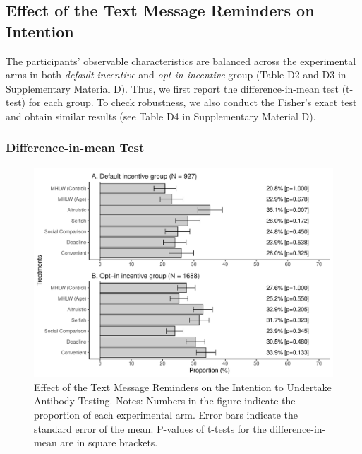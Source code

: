 \documentclass[
      12pt,
    a4paper
]{article}
\begin{document}
\hypertarget{intention}{%
\subsection{Effect of the Text Message Reminders on Intention}\label{intention}}

The participants' observable characteristics are balanced across the experimental arms in both \emph{default incentive} and \emph{opt-in incentive} group (Table D2 and D3 in Supplementary Material D). Thus, we first report the difference-in-mean test (t-test) for each group. To check robustness, we also conduct the Fisher's exact test and obtain similar results (see Table D4 in Supplementary Material D).

\hypertarget{difference-in-mean-test}{%
\subsubsection{Difference-in-mean Test}\label{difference-in-mean-test}}

\begin{figure}[t]
\includegraphics{Main-Document-LaTeX_files/figure-latex/ttest-int-test-1} \caption{Effect of the Text Message Reminders on the Intention to Undertake Antibody Testing. Notes: Numbers in the figure indicate the proportion of each experimental arm. Error bars indicate the standard error of the mean. P-values of t-tests for the difference-in-mean are in square brackets.}\label{fig:ttest-int-test}
\end{figure}
\end{document}
